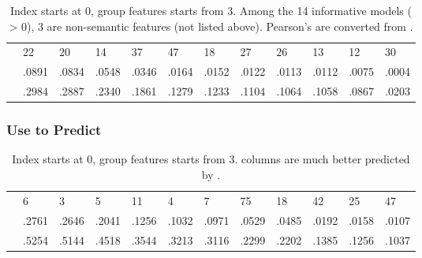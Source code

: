 \begin{table}
    \centering
    \begin{ThreePartTable}
    \begin{tabularx}{\textwidth}{p{1.7cm} *{11}{L}}
     \\
    \toprule
     & 22 & 20 & 14 & 37 & 47 & 18 & 27 & 26 & 13 & 12 & 30 \\ 
    \midrule 
     & .0891 & .0834 & .0548 & .0346 & .0164 & .0152 & .0122 & .0113 & .0112 & .0075 & .0004 \\  
     & .2984 & .2887 & .2340 & .1861 & .1279 & .1233 & .1104 & .1064 & .1058 & .0867 & .0203 \\
    \bottomrule
    \end{tabularx}
    \end{ThreePartTable}
    \caption[\texttt{SIM} Predicted \texttt{ASN} Column Model Performances]{Index starts at 0,  group features starts from 3.  Among the 14 informative models ( > 0), 3 are non-semantic features (not listed above). Pearson's  are converted from . \label{tab:SIMASNScores}}
\end{table}


\subsubsection{Use  to Predict }

\begin{table}
    \centering
    \begin{ThreePartTable}
    \begin{tabularx}{\textwidth}{p{1.7cm} *{11}{L}}
     \\
    \toprule
     & 6 & 3 & 5 & 11 & 4 & 7 & 75 & 18 & 42 & 25 & 47 \\  
    \midrule 

     & .2761 & .2646 & .2041 & .1256 & .1032 & .0971 & .0529 & .0485 & .0192 & .0158 & .0107 \\  
     & .5254 & .5144 & .4518 & .3544 & .3213 & .3116 & .2299 & .2202 & .1385 & .1256 & .1037 \\
    \bottomrule
    \end{tabularx}
    \end{ThreePartTable}
    \caption[\texttt{ASN} Predicted \texttt{SIM} Column Model Performances]{Index starts at 0,  group features starts from 3.  columns are much better predicted by . \label{tab:ASNSIMScores}}
\end{table}

